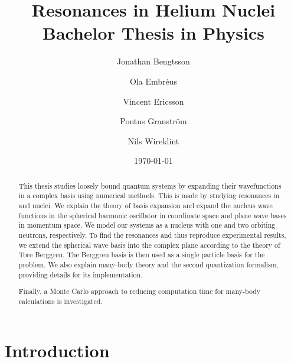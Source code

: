 \documentclass[12pt,a4paper]{report}
\begin{document}
  

\listoftodos


\title{Resonances in Helium Nuclei\\ 
\Large Bachelor Thesis in Physics}
\author{Jonathan Bengtsson \and Ola Embréus \and Vincent Ericsson \and Pontus Granström \and Nils Wireklint}
\date{\today}



\maketitle

\newpage
\begin{abstract}
This thesis studies loosely bound quantum systems by expanding their wavefunctions in a complex basis using numerical methods. This is made by studying
resonances in  and  nuclei. We explain the theory of basis
expansion and expand the  nucleus wave functions in the spherical harmonic oscillator in coordinate space
and plane wave bases in momentum space. We model our systems as a  nucleus with one and two orbiting neutrons, respectively.
To find the resonances and thus reproduce experimental results, we extend the spherical wave basis into the complex plane according to the 
theory of Tore Berggren.  The Berggren basis is then used as a single particle
basis for the  problem.  We also explain many-body theory and the second
quantization formalism, providing details for its implementation.


Finally, a
Monte Carlo approach to reducing computation time for many-body 
calculations is investigated.
\end{abstract}
\newpage


\tableofcontents
\newpage

\setcounter{page}{1}

\chapter{Introduction}
\label{cha:introduction}

\end{document}
